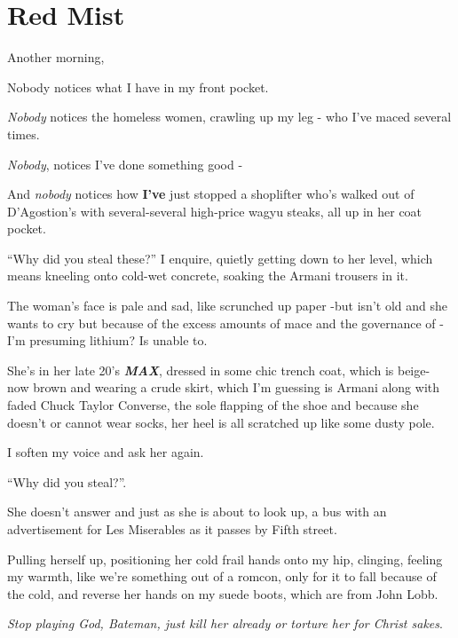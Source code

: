 \documentclass[19pt,openany]{book}
\begin{document}
\chapter{Red Mist}


Another morning,

Nobody notices what I
have in my front pocket.

\textit{Nobody} notices the homeless women,
crawling up my leg - who I've
maced several times.

\textit{Nobody}, notices I've done something good -

 And \textit{nobody} notices how
\textbf{I've} just stopped a shoplifter who's walked
out of D'Agostion's with several-several
high-price wagyu steaks, all up in her coat pocket.

``Why did you steal these?'' I enquire,
quietly getting down to her level,
which means kneeling onto cold-wet
concrete, soaking the Armani trousers in it.

The woman's face is pale and
sad, like scrunched up
paper -but
isn't old and she
wants to cry but
because of the excess
amounts of mace and the governance
of -I'm presuming
lithium? Is unable to.

She's in her late 20's \textit{\textbf{MAX}},
dressed in some chic trench coat, which is beige-
now brown and wearing a crude skirt, which
I'm guessing is Armani along with faded Chuck
Taylor Converse, the sole flapping of the shoe
and because she doesn't or cannot wear socks, her
heel is all scratched up like some dusty pole.

I soften my voice and ask her again.

``Why did you steal?''.

She doesn't answer
and just as she is about to look
up, a bus with an advertisement
for Les Miserables as it
passes by Fifth street.

Pulling herself up,
positioning her cold frail
hands onto my hip,
clinging,
feeling my warmth,
like we're something
out of a romcon, only
for it to fall because
of the cold, and reverse her
hands on my suede boots,
which are from John Lobb.

\textit{Stop playing God, Bateman,
just kill her already or torture
her for Christ sakes}.
\end{document}
